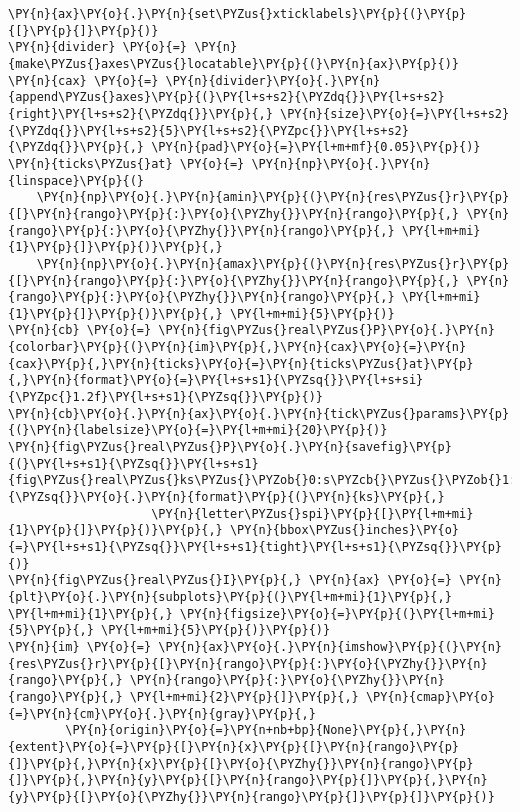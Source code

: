 \begin{Verbatim}[commandchars=\\\{\}]
\PY{n}{ax}\PY{o}{.}\PY{n}{set\PYZus{}xticklabels}\PY{p}{(}\PY{p}{[}\PY{p}{]}\PY{p}{)}
\PY{n}{divider} \PY{o}{=} \PY{n}{make\PYZus{}axes\PYZus{}locatable}\PY{p}{(}\PY{n}{ax}\PY{p}{)}
\PY{n}{cax} \PY{o}{=} \PY{n}{divider}\PY{o}{.}\PY{n}{append\PYZus{}axes}\PY{p}{(}\PY{l+s+s2}{\PYZdq{}}\PY{l+s+s2}{right}\PY{l+s+s2}{\PYZdq{}}\PY{p}{,} \PY{n}{size}\PY{o}{=}\PY{l+s+s2}{\PYZdq{}}\PY{l+s+s2}{5}\PY{l+s+s2}{\PYZpc{}}\PY{l+s+s2}{\PYZdq{}}\PY{p}{,} \PY{n}{pad}\PY{o}{=}\PY{l+m+mf}{0.05}\PY{p}{)}
\PY{n}{ticks\PYZus{}at} \PY{o}{=} \PY{n}{np}\PY{o}{.}\PY{n}{linspace}\PY{p}{(}
    \PY{n}{np}\PY{o}{.}\PY{n}{amin}\PY{p}{(}\PY{n}{res\PYZus{}r}\PY{p}{[}\PY{n}{rango}\PY{p}{:}\PY{o}{\PYZhy{}}\PY{n}{rango}\PY{p}{,} \PY{n}{rango}\PY{p}{:}\PY{o}{\PYZhy{}}\PY{n}{rango}\PY{p}{,} \PY{l+m+mi}{1}\PY{p}{]}\PY{p}{)}\PY{p}{,}
    \PY{n}{np}\PY{o}{.}\PY{n}{amax}\PY{p}{(}\PY{n}{res\PYZus{}r}\PY{p}{[}\PY{n}{rango}\PY{p}{:}\PY{o}{\PYZhy{}}\PY{n}{rango}\PY{p}{,} \PY{n}{rango}\PY{p}{:}\PY{o}{\PYZhy{}}\PY{n}{rango}\PY{p}{,} \PY{l+m+mi}{1}\PY{p}{]}\PY{p}{)}\PY{p}{,} \PY{l+m+mi}{5}\PY{p}{)}
\PY{n}{cb} \PY{o}{=} \PY{n}{fig\PYZus{}real\PYZus{}P}\PY{o}{.}\PY{n}{colorbar}\PY{p}{(}\PY{n}{im}\PY{p}{,}\PY{n}{cax}\PY{o}{=}\PY{n}{cax}\PY{p}{,}\PY{n}{ticks}\PY{o}{=}\PY{n}{ticks\PYZus{}at}\PY{p}{,}\PY{n}{format}\PY{o}{=}\PY{l+s+s1}{\PYZsq{}}\PY{l+s+si}{\PYZpc{}1.2f}\PY{l+s+s1}{\PYZsq{}}\PY{p}{)}
\PY{n}{cb}\PY{o}{.}\PY{n}{ax}\PY{o}{.}\PY{n}{tick\PYZus{}params}\PY{p}{(}\PY{n}{labelsize}\PY{o}{=}\PY{l+m+mi}{20}\PY{p}{)}
\PY{n}{fig\PYZus{}real\PYZus{}P}\PY{o}{.}\PY{n}{savefig}\PY{p}{(}\PY{l+s+s1}{\PYZsq{}}\PY{l+s+s1}{fig\PYZus{}real\PYZus{}ks\PYZus{}\PYZob{}0:s\PYZcb{}\PYZus{}\PYZob{}1:s\PYZcb{}}\PY{l+s+s1}{\PYZsq{}}\PY{o}{.}\PY{n}{format}\PY{p}{(}\PY{n}{ks}\PY{p}{,}
                    \PY{n}{letter\PYZus{}spi}\PY{p}{[}\PY{l+m+mi}{1}\PY{p}{]}\PY{p}{)}\PY{p}{,} \PY{n}{bbox\PYZus{}inches}\PY{o}{=}\PY{l+s+s1}{\PYZsq{}}\PY{l+s+s1}{tight}\PY{l+s+s1}{\PYZsq{}}\PY{p}{)}
\PY{n}{fig\PYZus{}real\PYZus{}I}\PY{p}{,} \PY{n}{ax} \PY{o}{=} \PY{n}{plt}\PY{o}{.}\PY{n}{subplots}\PY{p}{(}\PY{l+m+mi}{1}\PY{p}{,} \PY{l+m+mi}{1}\PY{p}{,} \PY{n}{figsize}\PY{o}{=}\PY{p}{(}\PY{l+m+mi}{5}\PY{p}{,} \PY{l+m+mi}{5}\PY{p}{)}\PY{p}{)}
\PY{n}{im} \PY{o}{=} \PY{n}{ax}\PY{o}{.}\PY{n}{imshow}\PY{p}{(}\PY{n}{res\PYZus{}r}\PY{p}{[}\PY{n}{rango}\PY{p}{:}\PY{o}{\PYZhy{}}\PY{n}{rango}\PY{p}{,} \PY{n}{rango}\PY{p}{:}\PY{o}{\PYZhy{}}\PY{n}{rango}\PY{p}{,} \PY{l+m+mi}{2}\PY{p}{]}\PY{p}{,} \PY{n}{cmap}\PY{o}{=}\PY{n}{cm}\PY{o}{.}\PY{n}{gray}\PY{p}{,}
        \PY{n}{origin}\PY{o}{=}\PY{n+nb+bp}{None}\PY{p}{,}\PY{n}{extent}\PY{o}{=}\PY{p}{[}\PY{n}{x}\PY{p}{[}\PY{n}{rango}\PY{p}{]}\PY{p}{,}\PY{n}{x}\PY{p}{[}\PY{o}{\PYZhy{}}\PY{n}{rango}\PY{p}{]}\PY{p}{,}\PY{n}{y}\PY{p}{[}\PY{n}{rango}\PY{p}{]}\PY{p}{,}\PY{n}{y}\PY{p}{[}\PY{o}{\PYZhy{}}\PY{n}{rango}\PY{p}{]}\PY{p}{]}\PY{p}{)}

\end{Verbatim}
